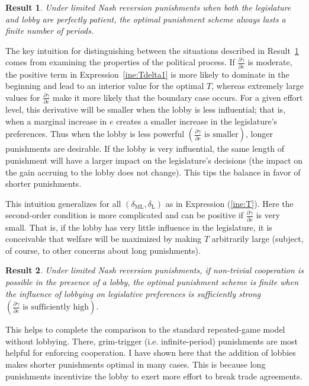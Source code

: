 \documentclass[authoryear, review]{elsarticle}
\newtheorem{result}{Result}
\newcommand{\ga}{\gamma}
\newcommand{\de}{\delta}
\begin{document}
\begin{result}
  Under limited Nash reversion punishments when both the legislature and lobby are perfectly patient, the optimal punishment scheme always lasts a finite number of periods.
  \label{res:opt1}
\end{result}

The key intuition for distinguishing between the situations described in Result~\ref{res:opt1} comes from examining the properties of the political process. If $\frac{\partial \ga}{\partial e}$ is moderate, the positive term in Expression~\ref{ine:Tdelta1} is more likely to dominate in the beginning and lead to an interior value for the optimal $T$, whereas extremely large values for $\frac{\partial \ga}{\partial e}$ make it more likely that the boundary case occurs. For a given effort level, this derivative will be smaller when the lobby is less influential; that is, when a marginal increase in $e$ creates a smaller increase in the legislature's preferences. Thus when the lobby is less powerful $\left(\frac{\partial \ga}{\partial e}\text{ is smaller}\right)$, longer punishments are desirable. If the lobby is very influential, the same length of punishment will have a larger impact on the legislature's decisions (the impact on the gain accruing to the lobby does not change). This tips the balance in favor of shorter punishments.

This intuition generalizes for all $\left(\de_\text{ML},\de_\text{L}\right)$ as in Expression (\ref{ine:T}). Here the second-order condition is more complicated and can be positive if $\frac{\partial \ga}{\partial e}$ is very small. That is, if the lobby has very little influence in the legislature, it is conceivable that welfare will be maximized by making $T$ arbitrarily large (subject, of course, to other concerns about long punishments).

\begin{result}
  Under limited Nash reversion punishments, if non-trivial cooperation is possible in the presence of a lobby, the optimal punishment scheme is finite when the influence of lobbying on legislative preferences is sufficiently strong $\left(\frac{\partial \ga}{\partial e}\text{ is sufficiently high}\right)$.
	\label{res:3}
\end{result}
This helps to complete the comparison to the standard repeated-game model without lobbying. There, grim-trigger (i.e. infinite-period) punishments are most helpful for enforcing cooperation. I have shown here that the addition of lobbies makes shorter punishments optimal in many cases. This is because long punishments incentivize the lobby to exert more effort to break trade agreements.
\end{document}
